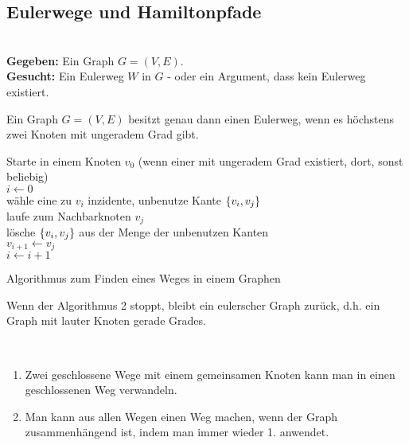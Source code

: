 	\subsection{Eulerwege und Hamiltonpfade}
	\begin{problem}[Eulerweg]~\\[5pt]
		\hspace*{10pt}\textbf{Gegeben: } Ein Graph $G = (V, E)$.\\[5pt]
		\hspace*{10pt}\textbf{Gesucht: } Ein Eulerweg $W$ in $G$ -  oder ein Argument, dass kein Eulerweg existiert.
	\end{problem}
	\begin{satz}
		Ein Graph $G = (V, E)$ besitzt genau dann einen Eulerweg, wenn es höchstens zwei Knoten mit ungeradem Grad gibt.
	\end{satz}
	\begin{algorithm}
		\vspace*{5pt}
		Starte in einem Knoten $v_0$ \newline(wenn einer mit ungeradem Grad existiert, dort, sonst beliebig)\\
		$i \leftarrow 0$\\
		{wähle eine zu $v_i$ inzidente, unbenutze Kante $\{v_i, v_j\}$\\
		laufe zum Nachbarknoten $v_j$\\
		lösche $\{v_i, v_j\}$ aus der Menge der unbenutzen Kanten\\
		$v_{i+1} \leftarrow v_j$\\
		$i \leftarrow i+1$
		}
		\caption{Algorithmus zum Finden eines Weges in einem Graphen}
	\end{algorithm}
	\begin{satz}
		Wenn der Algorithmus 2 stoppt, bleibt ein eulerscher Graph zurück, d.h. ein Graph mit lauter Knoten gerade Grades.
	\end{satz}
	\begin{korollar}~
		\begin{enumerate}
			\item Zwei geschlossene Wege mit einem gemeinsamen Knoten kann man in einen geschlossenen Weg verwandeln.
			\item Man kann aus allen Wegen einen Weg machen, wenn der Graph zusammenhängend ist, indem man immer wieder 1. anwendet.
		\end{enumerate}
	\end{korollar}
